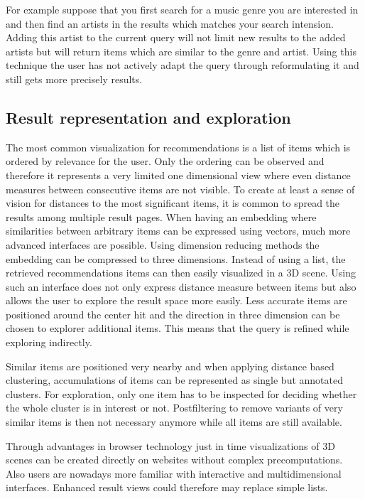 \documentclass[sigconf]{acmart}
\begin{document}
For example suppose that you first search for a music genre you are interested in and then find an artists in the results which matches your search intension. Adding this artist to the current query will not limit new results to the added artists but will return items which are similar to the genre and artist. Using this technique the user has not actively adapt the query through reformulating it and still gets more precisely results. \\

\subsection{Result representation and exploration}

The most common visualization for recommendations is a list of items which is ordered by relevance for the user. Only the ordering can be observed and therefore it represents a very limited one dimensional view where even distance measures between consecutive items are not visible. To create at least a sense of vision for distances to the most significant items, it is common to spread the results among multiple result pages. 
When having an embedding where similarities between arbitrary items can be expressed using vectors, much more advanced interfaces are possible. Using dimension reducing methods the embedding can be compressed to three dimensions. Instead of using a list, the retrieved recommendations items can then easily visualized in a 3D scene. Using such an interface does not only express distance measure between items but also allows the user to explore the result space more easily. Less accurate items are positioned around the center hit and the direction in three dimension can be chosen to explorer additional items. This means that the query is refined while exploring indirectly.

Similar items are positioned very nearby and when applying distance based clustering, accumulations of items can be represented as single but annotated clusters. For exploration, only one item has to be inspected for deciding whether the whole cluster is in interest or not. Postfiltering to remove variants of very similar items is then not necessary anymore while all items are still available.

Through advantages in browser technology just in time visualizations of 3D scenes can be created directly on websites without complex precomputations. Also users are nowadays more familiar with interactive and multidimensional interfaces. Enhanced result views could therefore may replace simple lists.
\end{document}
